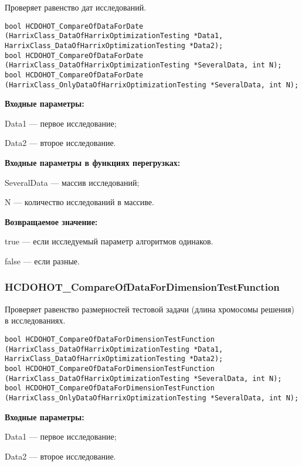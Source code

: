 \documentclass[a4paper,12pt]{article}
\begin{document}
Проверяет равенство дат исследований.


\begin{lstlisting}[label=code_syntax_HCDOHOT_CompareOfDataForDate,caption=Синтаксис]
bool HCDOHOT_CompareOfDataForDate (HarrixClass_DataOfHarrixOptimizationTesting *Data1, HarrixClass_DataOfHarrixOptimizationTesting *Data2);
bool HCDOHOT_CompareOfDataForDate (HarrixClass_DataOfHarrixOptimizationTesting *SeveralData, int N);
bool HCDOHOT_CompareOfDataForDate (HarrixClass_OnlyDataOfHarrixOptimizationTesting *SeveralData, int N);
\end{lstlisting}

\textbf{Входные параметры:}

Data1 --- первое исследование;

Data2 --- второе исследование.

\textbf{Входные параметры в функциях перегрузках:}

SeveralData --- массив исследований;

N --- количество исследований в массиве.

\textbf{Возвращаемое значение:}

true --- если исследуемый параметр алгоритмов одинаков.

false --- если разные.


\subsubsection{HCDOHOT\_CompareOfDataForDimensionTestFunction}\label{HCDOHOT_CompareOfDataForDimensionTestFunction}

Проверяет равенство размерностей тестовой задачи (длина хромосомы решения) в исследованиях.


\begin{lstlisting}[label=code_syntax_HCDOHOT_CompareOfDataForDimensionTestFunction,caption=Синтаксис]
bool HCDOHOT_CompareOfDataForDimensionTestFunction (HarrixClass_DataOfHarrixOptimizationTesting *Data1, HarrixClass_DataOfHarrixOptimizationTesting *Data2);
bool HCDOHOT_CompareOfDataForDimensionTestFunction (HarrixClass_DataOfHarrixOptimizationTesting *SeveralData, int N);
bool HCDOHOT_CompareOfDataForDimensionTestFunction (HarrixClass_OnlyDataOfHarrixOptimizationTesting *SeveralData, int N);
\end{lstlisting}

\textbf{Входные параметры:}

Data1 --- первое исследование;

Data2 --- второе исследование.
\end{document}
